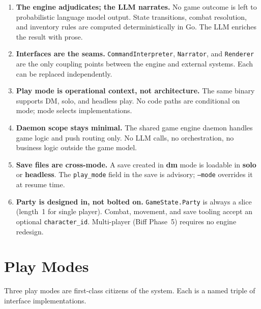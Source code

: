 \documentclass[a4paper,10pt]{article}
\newcommand{\iface}[1]{\texttt{#1}}
\newcommand{\cmd}[1]{\texttt{#1}}
\newcommand{\field}[1]{\texttt{#1}}
\newcommand{\mode}[1]{\textbf{#1}}
\begin{document}
\begin{enumerate}[label=\textbf{P\arabic*}.]
  \item \textbf{The engine adjudicates; the LLM narrates.}
    No game outcome is left to probabilistic language model output.
    State transitions, combat resolution, and inventory rules are
    computed deterministically in Go.  The LLM enriches the result
    with prose.
  \item \textbf{Interfaces are the seams.}
    \iface{CommandInterpreter}, \iface{Narrator}, and
    \iface{Renderer} are the only coupling points between the engine
    and external systems.  Each can be replaced independently.
  \item \textbf{Play mode is operational context, not architecture.}
    The same binary supports DM, solo, and headless play.  No code
    paths are conditional on mode; mode selects implementations.
  \item \textbf{Daemon scope stays minimal.}
    The shared game engine daemon handles game logic and push
    routing only.  No LLM calls, no orchestration, no business
    logic outside the game model.
  \item \textbf{Save files are cross-mode.}
    A save created in \mode{dm} mode is loadable in \mode{solo} or
    \mode{headless}.  The \field{play\_mode} field in the save is
    advisory; \cmd{--mode} overrides it at resume time.
  \item \textbf{Party is designed in, not bolted on.}
    \texttt{GameState.Party} is always a slice (length~1 for single
    player).  Combat, movement, and save tooling accept an optional
    \field{character\_id}.  Multi-player (Biff Phase~5) requires no
    engine redesign.
\end{enumerate}

\section{Play Modes}

Three play modes are first-class citizens of the system.  Each is a
named triple of interface implementations.
\end{document}
